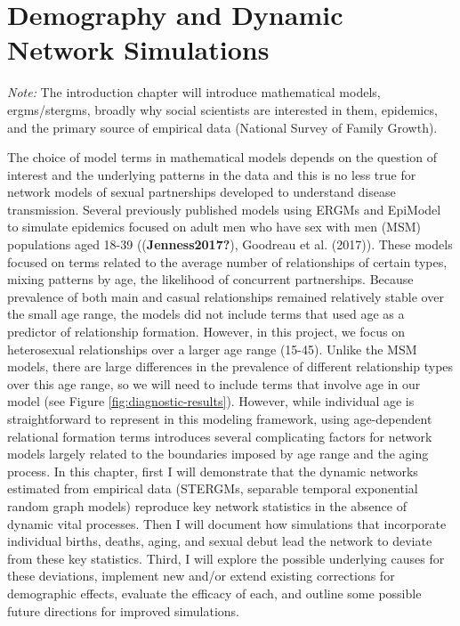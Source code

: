 \documentclass [11pt, proquest] {uwthesis}[2015/03/03]
\begin{document}
\hypertarget{nets}{%
\chapter{Demography and Dynamic Network Simulations}\label{nets}}

\emph{Note:}
The introduction chapter will introduce mathematical models, ergms/stergms, broadly why social scientists are interested in them, epidemics, and the primary source of empirical data (National Survey of Family Growth).

The choice of model terms in mathematical models depends on the question of interest and the underlying patterns in the data and this is no less true for network models of sexual partnerships developed to understand disease transmission. Several previously published models using ERGMs and EpiModel to simulate epidemics focused on adult men who have sex with men (MSM) populations aged 18-39 ((\textbf{Jenness2017?}), Goodreau et al. (2017)). These models focused on terms related to the average number of relationships of certain types, mixing patterns by age, the likelihood of concurrent partnerships. Because prevalence of both main and casual relationships remained relatively stable over the small age range, the models did not include terms that used age as a predictor of relationship formation. However, in this project, we focus on heterosexual relationships over a larger age range (15-45). Unlike the MSM models, there are large differences in the prevalence of different relationship types over this age range, so we will need to include terms that involve age in our model (see Figure \ref{fig:diagnostic-results}). However, while individual age is straightforward to represent in this modeling framework, using age-dependent relational formation terms introduces several complicating factors for network models largely related to the boundaries imposed by age range and the aging process. In this chapter, first I will demonstrate that the dynamic networks estimated from empirical data (STERGMs, separable temporal exponential random graph models) reproduce key network statistics in the absence of dynamic vital processes. Then I will document how simulations that incorporate individual births, deaths, aging, and sexual debut lead the network to deviate from these key statistics. Third, I will explore the possible underlying causes for these deviations, implement new and/or extend existing corrections for demographic effects, evaluate the efficacy of each, and outline some possible future directions for improved simulations.
\end{document}
